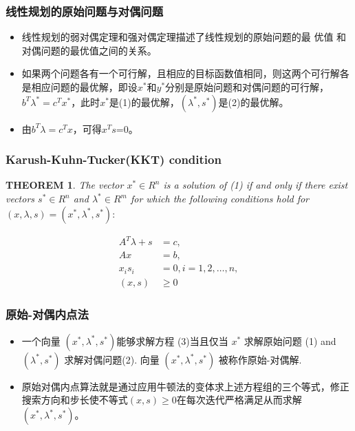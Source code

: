 \documentclass[notheorems,mathserif,table,compress]{beamer}  %
\begin{document}
%
\begin{frame}
\frametitle{线性规划的原始问题与对偶问题}
\begin{itemize}
\item 线性规划的弱对偶定理和强对偶定理描述了线性规划的原始问题的最 优值
和对偶问题的最优值之间的关系。
\item 如果两个问题各有一个可行解，且相应的目标函数值相同，则这两个可行解各是相应问题的最优解，即设$x^*$和$y^*$分别是原始问题和对偶问题的可行解，$b^T\lambda^*=c^Tx^*$，此时$x^*$是(1)的最优解，$(\lambda^*,s^*)$是(2)的最优解。
\item 由$b^T\lambda=c^Tx$，可得$x^Ts$=0。
\end{itemize}
\end{frame}

%
\begin{frame}
\frametitle{Karush-Kuhn-Tucker(KKT) condition}
\theoremstyle{plain}
\newtheorem{theorem}{THEOREM}
\begin{theorem}
The vector $x^*\in R^n$ is a solution of (1) if and only if there exist vectors $s^*\in R^n$ and $\lambda^* \in R^m$ for which the following conditions hold for $(x,\lambda,s)=(x^*,\lambda^*,s^*):$

\begin{equation}
\begin{split}
A^{T}\lambda+s&=c,\\
Ax&=b,\\
x_is_i&=0, i=1,2,\dots,n,\\
(x,s)&\geq0
\end{split}
\end{equation}
\end{theorem}
\end{frame}

%
\begin{frame}
\frametitle{原始-对偶内点法}
\begin{itemize}
\item 
一个向量 $(x^*,\lambda^*,s^*)$能够求解方程 (3)当且仅当 $x^*$ 求解原始问题 (1) and $(\lambda^*,s^*)$ 求解对偶问题(2). 向量 $(x^*,\lambda^*,s^*)$ 被称作原始-对偶解.
\item 原始对偶内点算法就是通过应用牛顿法的变体求上述方程组的三个等式，修正搜索方向和步长使不等式$(x,s)\geq0$在每次迭代严格满足从而求解$(x^*,\lambda^*,s^*)$。
\end{itemize}
\end{frame}
\end{document}
